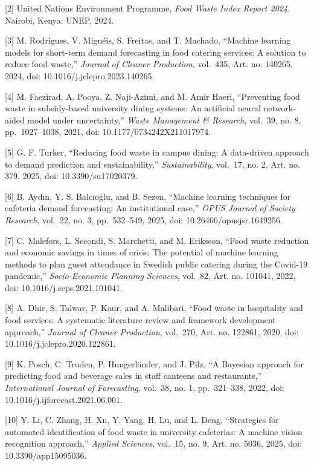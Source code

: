 \documentclass[conference]{IEEEtran}
\begin{document}
{[}2{]} United Nations Environment Programme, \emph{Food Waste Index
Report 2024}. Nairobi, Kenya: UNEP, 2024.

{[}3{]} M. Rodrigues, V. Miguéis, S. Freitas, and T. Machado, ``Machine
learning models for short-term demand forecasting in food catering
services: A solution to reduce food waste,'' \emph{Journal of Cleaner
Production}, vol.~435, Art. no. 140265, 2024, doi:
10.1016/j.jclepro.2023.140265.

{[}4{]} M. Faezirad, A. Pooya, Z. Naji-Azimi, and M. Amir Haeri,
``Preventing food waste in subsidy-based university dining systems: An
artificial neural network-aided model under uncertainty,'' \emph{Waste
Management \& Research}, vol.~39, no. 8, pp.~1027--1038, 2021, doi:
10.1177/0734242X211017974.

{[}5{]} G. F. Turker, ``Reducing food waste in campus dining: A
data-driven approach to demand prediction and sustainability,''
\emph{Sustainability}, vol.~17, no. 2, Art. no. 379, 2025, doi:
10.3390/su17020379.

{[}6{]} B. Aydın, Y. S. Balcıoğlu, and B. Sezen, ``Machine learning
techniques for cafeteria demand forecasting: An institutional case,''
\emph{OPUS Journal of Society Research}, vol.~22, no. 3, pp.~532--549,
2025, doi: 10.26466/opusjsr.1649256.

{[}7{]} C. Malefors, L. Secondi, S. Marchetti, and M. Eriksson, ``Food
waste reduction and economic savings in times of crisis: The potential
of machine learning methods to plan guest attendance in Swedish public
catering during the Covid-19 pandemic,'' \emph{Socio-Economic Planning
Sciences}, vol.~82, Art. no. 101041, 2022, doi:
10.1016/j.seps.2021.101041.

{[}8{]} A. Dhir, S. Talwar, P. Kaur, and A. Malibari, ``Food waste in
hospitality and food services: A systematic literature review and
framework development approach,'' \emph{Journal of Cleaner Production},
vol.~270, Art. no. 122861, 2020, doi: 10.1016/j.jclepro.2020.122861.

{[}9{]} K. Posch, C. Truden, P. Hungerländer, and J. Pilz, ``A Bayesian
approach for predicting food and beverage sales in staff canteens and
restaurants,'' \emph{International Journal of Forecasting}, vol.~38, no.
1, pp.~321--338, 2022, doi: 10.1016/j.ijforecast.2021.06.001.

{[}10{]} Y. Li, C. Zhang, H. Xu, Y. Yang, H. Lu, and L. Deng,
``Strategies for automated identification of food waste in university
cafeterias: A machine vision recognition approach,'' \emph{Applied
Sciences}, vol.~15, no. 9, Art. no. 5036, 2025, doi:
10.3390/app15095036.
\end{document}
